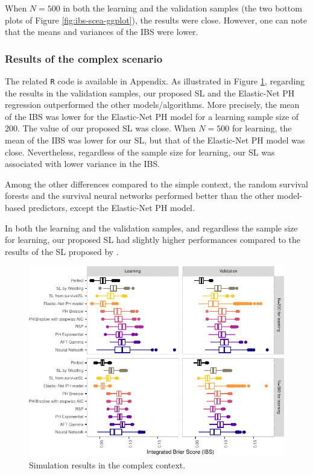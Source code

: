 When \(N=500\) in both the learning and the validation samples (the two bottom plots of Figure \ref{fig:ibs-scea-ggplot}), the results were close. However, one can note that the means and variances of the IBS were lower.

\hypertarget{results-of-the-complex-scenario}{%
\subsubsection{Results of the complex scenario}\label{results-of-the-complex-scenario}}

The related \texttt{R} code is available in Appendix. As illustrated in Figure \ref{fig:ibs-sceb-ggplot}, regarding the results in the validation samples, our proposed SL and the Elastic-Net PH regression outperformed the other models/algorithms. More precisely, the mean of the IBS was lower for the Elastic-Net PH model for a learning sample size of 200. The value of our proposed SL was close. When \(N=500\) for learning, the mean of the IBS was lower for our SL, but that of the Elastic-Net PH model was close. Nevertheless, regardless of the sample size for learning, our SL was associated with lower variance in the IBS.

Among the other differences compared to the simple context, the random survival forests and the survival neural networks performed better than the other model-based predictors, except the Elastic-Net PH model.

In both the learning and the validation samples, and regardless the sample size for learning, our proposed SL had slightly higher performances compared to the results of the SL proposed by \citet{westlingPkgsurvSuperLearnerSuperLearning2021}.

\begin{figure}

{\centering \includegraphics{RJ-2024-037_files/figure-latex/ibs-sceb-ggplot-1} 

}

\caption{Simulation results in the complex context.}\label{fig:ibs-sceb-ggplot}
\end{figure}


